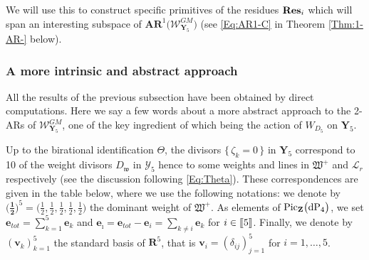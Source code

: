 \documentclass[11pt]{amsart}
\newcommand{\sk}{\smallskip}
\begin{document}
We will use this to  construct specific primitives of the residues ${\bf Res}_i$ which will span an interesting subspace of $\boldsymbol{AR}^1\big(\boldsymbol{\mathcal W}^{GM}_{ \boldsymbol{Y}_5}\big)$ (see \eqref{Eq:AR1-C} in Theorem \ref{Thm:1-AR-} below). 


\subsubsection{\bf A more intrinsic and abstract approach}
All the results of the previous subsection have been obtained by direct computations. Here we say a few words about a more abstract approach to the 2-ARs of ${\boldsymbol{\mathcal W}_{\boldsymbol{Y}_5}^{GM}}$, one of the key ingredient of which being the action of $W_{D_5}$ on $\boldsymbol{Y}_5$.
\sk



Up to the birational identification $\Theta$, the divisors $\{\,\zeta_k=0\,\}$ in $\boldsymbol{Y}_5$ correspond to 10 of the weight divisors $D_{\mathfrak w}$ in 
$\boldsymbol{\mathcal Y}_5$ hence to some weights and lines in $\mathfrak W^+$ and $\boldsymbol{\mathcal L}_r$ respectively (see the discussion following 
\eqref{Eq:Theta}). These correspondences are given in the table below, where we use the following notations:  we denote by $\big(\boldsymbol{\frac{1}{2}}\big)^5=\big( \frac{1}{2},\frac{1}{2},\frac{1}{2},\frac{1}{2},\frac{1}{2}\big)$ the dominant weight of $\mathfrak W^+$. As elements of ${\rm Pic}_{\mathbf Z}\big({\rm dP}_4\big)$, 
we set 
$\boldsymbol{e}_{tot}=\sum_{k=1}^5  \boldsymbol{e}_k$ 
and $\boldsymbol{e}_{\hat \imath}=\boldsymbol{e}_{tot}-\boldsymbol{e}_i=\sum_{k\neq i} \boldsymbol{e}_k$ for $i\in [\hspace{-0.05cm}[5]\hspace{-0.05cm}]$. Finally, we denote by $(\boldsymbol{v}_k)_{k=1}^5$ the standard basis of $\mathbf R^5$, that is  
$\boldsymbol{v}_i=(\delta_{ij})_{j=1}^5$ for $i=1,\ldots,5$. 
\end{document}
